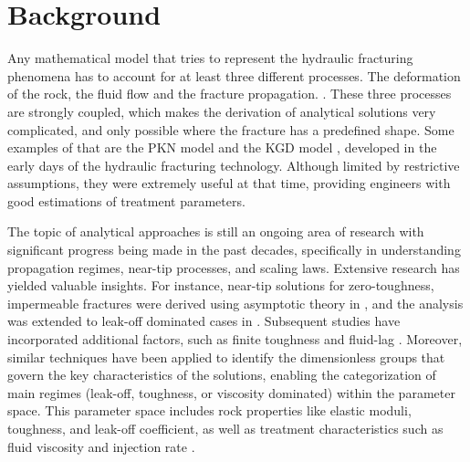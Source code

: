 \section{Background}







    Any mathematical model that tries to represent the hydraulic fracturing phenomena has to account for at least three different processes. The deformation of the rock, the fluid flow and the fracture propagation. \cite{adachi2007computer}. These three processes are strongly coupled, which makes the derivation of analytical solutions very complicated, and only possible where the fracture has a predefined shape. Some examples of that are the PKN model \cite{perkins1961widths, sneddon1946opening, nordgren1972propagation} and the KGD model \cite{zheltov19553, geertsma1969rapid}, developed in the early days of the hydraulic fracturing technology. Although limited by restrictive assumptions, they were extremely useful at that time, providing engineers with good estimations of treatment parameters.


    The topic of analytical approaches is still an ongoing area of research with significant progress being made in the past decades, specifically in understanding propagation regimes, near-tip processes, and scaling laws. Extensive research has yielded valuable insights. For instance, near-tip solutions for zero-toughness, impermeable fractures were derived using asymptotic theory in \cite{desroches1994crack}, and the analysis was extended to leak-off dominated cases in \cite{lenoach1995crack}. Subsequent studies have incorporated additional factors, such as finite toughness and fluid-lag \cite{detournay2002asymptotic, detournay2003near, garagash2000tip}. Moreover, similar techniques have been applied to identify the dimensionless groups that govern the key characteristics of the solutions, enabling the categorization of main regimes (leak-off, toughness, or viscosity dominated) within the parameter space. This parameter space includes rock properties like elastic moduli, toughness, and leak-off coefficient, as well as treatment characteristics such as fluid viscosity and injection rate \cite{detournay2004propagation, adachi2002self, carbonell1999comparison, savitski2002propagation, garagash2005plane}.

